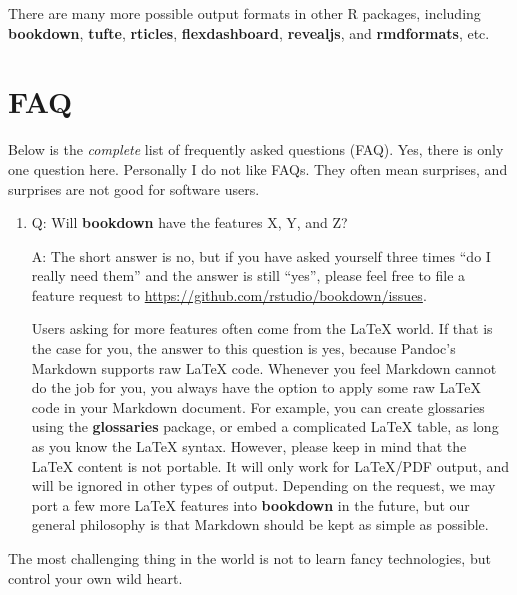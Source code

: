 \documentclass[
  12pt,
]{krantz}
\theoremstyle{definition}
\theoremstyle{definition}
\theoremstyle{definition}
\theoremstyle{definition}
\theoremstyle{remark}
\begin{document}
There are many more possible output formats in other R packages, including \textbf{bookdown}, \textbf{tufte}, \textbf{rticles}, \textbf{flexdashboard}, \textbf{revealjs}, and \textbf{rmdformats}, etc.

\chapter{FAQ}\label{faq}

Below is the \emph{complete} list of frequently asked questions (FAQ). Yes, there is only one question here. Personally I do not like FAQs. They often mean surprises, and surprises are not good for software users.

\begin{enumerate}
\def\labelenumi{\arabic{enumi}.}
\item
  Q: Will \textbf{bookdown} have the features X, Y, and Z?

  A: The short answer is no, but if you have asked yourself three times ``do I really need them'' and the answer is still ``yes'', please feel free to file a feature request to \url{https://github.com/rstudio/bookdown/issues}.

  Users asking for more features often come from the LaTeX world. If that is the case for you, the answer to this question is yes, because Pandoc's Markdown supports raw LaTeX code. Whenever you feel Markdown cannot do the job for you, you always have the option to apply some raw LaTeX code in your Markdown document. For example, you can create glossaries using the \textbf{glossaries} package, or embed a complicated LaTeX table, as long as you know the LaTeX syntax. However, please keep in mind that the LaTeX content is not portable. It will only work for LaTeX/PDF output, and will be ignored in other types of output. Depending on the request, we may port a few more LaTeX features into \textbf{bookdown} in the future, but our general philosophy is that Markdown should be kept as simple as possible.
\end{enumerate}

The most challenging thing in the world is not to learn fancy technologies, but control your own wild heart.

\backmatter



\printindex
\end{document}
